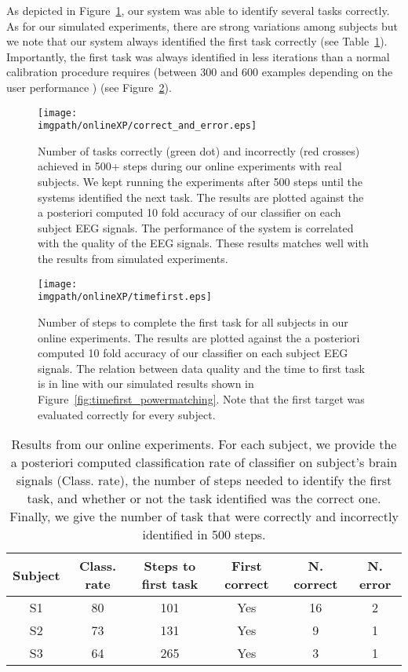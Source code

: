 As depicted in Figure~\ref{fig:correcterror_online}, our system was able to identify several tasks correctly. As for our simulated experiments, there are strong variations among subjects but we note that our system always identified the first task correctly (see Table~\ref{tab:onlineXPsummary}). Importantly, the first task was always identified in less iterations than a normal calibration procedure requires (between 300 and 600 examples depending on the user performance \cite{chavarriaga2010learning,iturrate2010single}) (see Figure~\ref{fig:timefirst_online}).


\begin{figure}[!htbp]
\centering
\texttt{[image: \\imgpath/onlineXP/correct\_and\_error.eps]}
\caption{Number of tasks correctly (green dot) and incorrectly (red crosses) achieved in 500+ steps during our online experiments with real subjects. We kept running the experiments after 500 steps until the systems identified the next task. The results are plotted against the a posteriori computed 10 fold accuracy of our classifier on each subject EEG signals. The performance of the system is correlated with the quality of the EEG signals. These results matches well with the results from simulated experiments.}
\label{fig:correcterror_online}
\end{figure} 


\begin{figure}[!htbp]
\centering
\texttt{[image: \\imgpath/onlineXP/timefirst.eps]}
\caption{Number of steps to complete the first task for all subjects in our online experiments. The results are plotted against the a posteriori computed 10 fold accuracy of our classifier on each subject EEG signals. The relation between data quality and the time to first task is in line with our simulated results shown in Figure~\ref{fig:timefirst_powermatching}. Note that the first target was evaluated correctly for every subject.}
\label{fig:timefirst_online}
\end{figure} 


\begin{table}
\centering
{}
\begin{tabular}{c c c c c c}
    Subject & Class. rate & Steps to first task & First correct & N. correct & N. error\\ \hline
    S1 & 80 & 101 & Yes & 16 & 2\\ 
    S2 & 73 & 131 & Yes & 9 & 1\\
    S3 & 64 & 265 & Yes & 3 & 1\\
\end{tabular}
\caption{Results from our online experiments. For each subject, we provide the a posteriori computed classification rate of classifier on subject's brain signals (Class. rate), the number of steps needed to identify the first task, and whether or not the task identified was the correct one. Finally, we give the number of task that were correctly and incorrectly identified in 500 steps.} 
\label{tab:onlineXPsummary}
\end{table}

